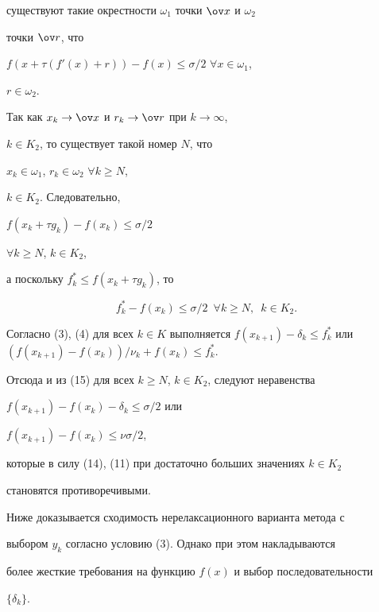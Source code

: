 \begin{pf}
существуют такие окрестности $\omega_1$ точки $\ov x$ и $\omega_2$


точки $\ov r$, что


$f(x+\tau (f'(x)+r))-f(x)\le \sigma /2$ $\forall x\in\omega_1$,


$r\in \omega_2$.


Так как $x_k\to \ov x$ и $r_k\to \ov r$ при $k\to \infty$,


$k\in K_2$, то существует такой номер $N$, что 


$x_k\in \omega_1$, $r_k\in \omega_2$ $\forall k\geq N$,


$k\in K_2$. Следовательно,


$f(x_k+\tau g_k)-f(x_k)\leq \sigma /2$


$\forall k\geq N$, $k\in K_2$, 


а поскольку $f^{*}_k\leq f(x_k+\tau g_k)$, то


\begin{equation}


f^*_k-f(x_k)\leq \sigma /2 \ \; \forall k\geq N,\ \; k\in K_2.


\end{equation}


Согласно (3), (4) для всех $k\in K$ выполняется $f(x_{k+1})-\delta_k


\leq f^*_k$ или $(f(x_{k+1})-f(x_k))/\nu_k+f(x_k)\leq f^*_k$.


Отсюда и из (15) для всех $k\geq N$, $k\in K_2$, следуют неравенства


$f(x_{k+1})-f(x_k)-\delta_k\leq \sigma /2$ или


$f(x_{k+1})-f(x_k)\leq \nu \sigma /2$,


которые в силу (14), (11) при достаточно больших значениях $k\in K_2$


становятся противоречивыми.


\end{pf}





Ниже доказывается сходимость нерелаксационного варианта метода с


выбором $y_k$ согласно условию (3). Однако при этом накладываются


более жесткие требования на функцию $f(x)$ и выбор последовательности


$\{\delta_k\}$.





